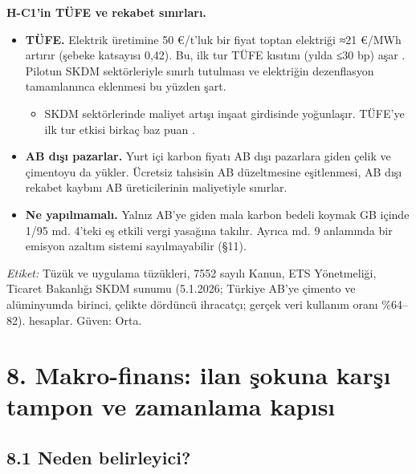\endgroup

\textbf{H-C1'in TÜFE ve rekabet sınırları.}

\begin{itemize}
\tightlist
\item
  \textbf{TÜFE.} Elektrik üretimine 50 €/t'luk bir fiyat toptan elektriği ≈21 €/MWh artırır (şebeke katsayısı 0,42). Bu, ilk tur TÜFE kısıtını (yılda ≤30 bp) aşar \etiketH{}. Pilotun SKDM sektörleriyle sınırlı tutulması ve elektriğin dezenflasyon tamamlanınca eklenmesi bu yüzden şart.

  \begin{itemize}
  \tightlist
  \item
    SKDM sektörlerinde maliyet artışı inşaat girdisinde yoğunlaşır. TÜFE'ye ilk tur etkisi birkaç baz puan \etiketH{}.
  \end{itemize}
\item
  \textbf{AB dışı pazarlar.} Yurt içi karbon fiyatı AB dışı pazarlara giden çelik ve çimentoyu da yükler. Ücretsiz tahsisin AB düzeltmesine eşitlenmesi, AB dışı rekabet kaybını AB üreticilerinin maliyetiyle sınırlar.
\item
  \textbf{Ne yapılmamalı.} Yalnız AB'ye giden mala karbon bedeli koymak GB içinde 1/95 md. 4'teki eş etkili vergi yasağına takılır. Ayrıca md. 9 anlamında bir emisyon azaltım sistemi sayılmayabilir (§11).
\end{itemize}

\emph{Etiket:} \etiketV{} Tüzük ve uygulama tüzükleri, 7552 sayılı Kanun, ETS Yönetmeliği, Ticaret Bakanlığı SKDM sunumu (5.1.2026; Türkiye AB'ye çimento ve alüminyumda birinci, çelikte dördüncü ihracatçı; gerçek veri kullanım oranı \%64--82). \etiketT{} hesaplar. Güven: Orta.

\hypertarget{02c_hazirlik-8-makro-finans-ilan-ux15fokuna-karux15fux131-tampon-ve-zamanlama-kapux131sux131}{%
\section{8. Makro-finans: ilan şokuna karşı tampon ve zamanlama kapısı}\label{02c_hazirlik-8-makro-finans-ilan-ux15fokuna-karux15fux131-tampon-ve-zamanlama-kapux131sux131}}

\hypertarget{02c_hazirlik-81-neden-belirleyici}{%
\subsection{8.1 Neden belirleyici?}\label{02c_hazirlik-81-neden-belirleyici}}

